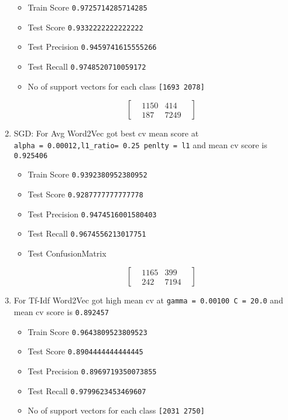 \documentclass[11pt]{article}
\providecommand{\tightlist}{%
      \setlength{\itemsep}{0pt}\setlength{\parskip}{0pt}}
\begin{document}
\begin{enumerate}
  \begin{itemize}
  \tightlist
  \item
    Train Score \texttt{0.9725714285714285}
  \item
    Test Score \texttt{0.9332222222222222}
  \item
    Test Precision \texttt{0.9459741615555266}
  \item
    Test Recall \texttt{0.9748520710059172}
  \item
    No of support vectors for each class \texttt{{[}1693\ 2078{]}}

    \begin{equation}
    \begin{bmatrix}
    & 1150 & 414 &  \\
    & 187 & 7249 & 
    \end{bmatrix}
    \end{equation}
  \end{itemize}
\item
  SGD: For Avg Word2Vec got best cv mean score at
  \texttt{alpha\ =\ 0.00012,l1\_ratio=\ 0.25\ penlty\ =\ l1} and mean cv
  score is \texttt{0.925406}

  \begin{itemize}
  \tightlist
  \item
    Train Score \texttt{0.9392380952380952}
  \item
    Test Score \texttt{0.9287777777777778}
  \item
    Test Precision \texttt{0.9474516001580403}
  \item
    Test Recall \texttt{0.9674556213017751}
  \item
    Test ConfusionMatrix

    \begin{equation}
    \begin{bmatrix}
    & 1165 & 399 &  \\
    & 242 & 7194 & 
    \end{bmatrix}
    \end{equation}
  \end{itemize}
\item
  For Tf-Idf Word2Vec got high mean cv at
  \texttt{gamma\ =\ 0.00100\ C\ =\ 20.0} and mean cv score is
  \texttt{0.892457}

  \begin{itemize}
  \tightlist
  \item
    Train Score \texttt{0.9643809523809523}
  \item
    Test Score \texttt{0.8904444444444445}
  \item
    Test Precision \texttt{0.8969719350073855}
  \item
    Test Recall \texttt{0.9799623453469607}
  \item
    No of support vectors for each class \texttt{{[}2031\ 2750{]}}


\end{itemize}
\end{enumerate}
\end{document}
